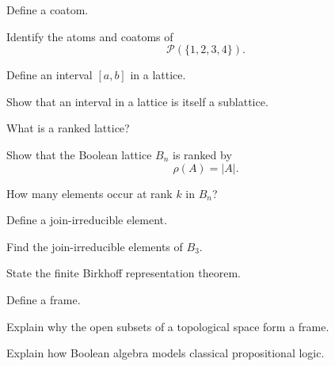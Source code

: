 \begin{exercise}[1]
Define a coatom.
\end{exercise}

\begin{exercise}[2]
Identify the atoms and coatoms of
\[ \mathcal P(\{1,2,3,4\}). \]
\end{exercise}

\begin{exercise}[1]
Define an interval \([a,b]\) in a lattice.
\end{exercise}

\begin{exercise}[2]
Show that an interval in a lattice is itself a sublattice.
\end{exercise}

\begin{exercise}[1]
What is a ranked lattice?
\end{exercise}

\begin{exercise}[2]
Show that the Boolean lattice \(B_n\) is ranked by
\[ \rho(A)=|A|. \]
\end{exercise}

\begin{exercise}[2]
How many elements occur at rank \(k\) in \(B_n\)?
\end{exercise}

\begin{exercise}[1]
Define a join-irreducible element.
\end{exercise}

\begin{exercise}[2]
Find the join-irreducible elements of \(B_3\).
\end{exercise}

\begin{exercise}[2]
State the finite Birkhoff representation theorem.
\end{exercise}

\begin{exercise}[1]
Define a frame.
\end{exercise}

\begin{exercise}[2]
Explain why the open subsets of a topological space form a frame.
\end{exercise}

\begin{exercise}[2]
Explain how Boolean algebra models classical propositional logic.
\end{exercise}

